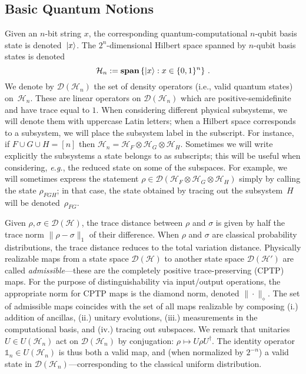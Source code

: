 \subsection{Basic Quantum Notions}
\label{sec:quantum-prelims}
\cite{CH05}
Given an $n$-bit string $x$, the corresponding quantum-computational $n$-qubit basis state is denoted~${\lvert}x\rangle$. The $2^n$-dimensional Hilbert space spanned by $n$-qubit basis states is denoted
$$
\mathcal{H}_n := \textbf{span} \left\{ {\lvert}x\rangle : x \in \{0,1\}^{n} \right\}\,.
$$
We denote by $\mathcal{D}(\mathcal{H}_n)$ the set of density operators (i.e., valid quantum states) on~$\mathcal{H}_n$. These are linear operators on $\mathcal{D}(\mathcal{H}_n)$ which are positive-semidefinite and have trace equal to $1$. When considering different physical subsystems, we will denote them with uppercase Latin letters; when a Hilbert space corresponds to a subsystem, we will place the subsystem label in the subscript. For instance, if $F \cup G \cup H = [n]$ then $\mathcal{H}_n = \mathcal{H}_F \otimes \mathcal{H}_G \otimes \mathcal{H}_H.$ Sometimes we will write explicitly the subsystems a state belongs to as subscripts; this will be useful when considering, \emph{e.g.}, the reduced state on some of the subspaces. For example, we will sometimes express the statement $\rho \in \mathcal{D}(\mathcal{H}_F \otimes \mathcal{H}_G \otimes \mathcal{H}_H)$ simply by calling the state $\rho_{FGH}$; in that case, the state obtained by tracing out the subsystem~$H$ will be denoted~$\rho_{FG}$.


Given $\rho, \sigma \in \mathcal{D}(\mathcal{H})$, the trace distance between $\rho$ and $\sigma$ is given by half the trace norm $\|\rho - \sigma\|_1$ of their difference. When $\rho$ and $\sigma$ are classical probability distributions, the trace distance reduces to the total variation distance. Physically realizable maps from a state space $\mathcal{D}(\mathcal{H})$ to another state space $\mathcal{D}(\mathcal{H}')$ are called \emph{admissible}---these are the completely positive trace-preserving (CPTP) maps. For the purpose of distinguishability via input/output operations, the appropriate norm for CPTP maps is the diamond norm, denoted $\|\cdot\|_\diamond$. The set of admissible maps coincides with the set of all maps realizable by composing (i.) addition of ancillas, (ii.) unitary evolutions, (iii.) measurements in the computational basis, and (iv.) tracing out subspaces. We remark that unitaries $U \in U(\mathcal{H}_n)$ act on $\mathcal{D}(\mathcal{H}_n)$ by conjugation: $\rho \mapsto U \rho U^\dagger$. The identity operator~$\mathds{1}_n \in U(\mathcal{H}_n)$ is thus both a valid map, and (when normalized by $2^{-n}$) a valid state in $\mathcal{D}(\mathcal{H}_n)$---corresponding to the classical uniform distribution.


